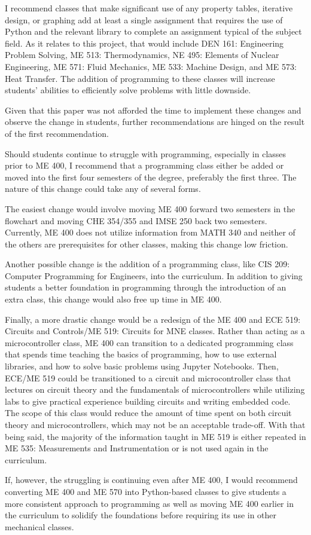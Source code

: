 I recommend classes that make significant use of any property tables, 
iterative design, or graphing add at least a single assignment that 
requires the use of Python and the relevant library to complete an assignment
typical of the subject field. As it relates to this project, that would include
DEN 161: Engineering Problem Solving, ME 513: Thermodynamics, NE 495: Elements 
of Nuclear Engineering, ME 571: Fluid Mechanics, ME 533: Machine Design, and 
ME 573: Heat Transfer. The addition of programming to these classes will 
increase students' abilities to efficiently solve problems with little downside. 

Given that this paper was not afforded the time to implement these changes
and observe the change in students, further recommendations are hinged on the
result of the first recommendation.

Should students continue to struggle with programming, especially in
classes prior to ME 400, I recommend that a programming class either be 
added or moved into the first four semesters of the degree, preferably 
the first three. The nature of this change could take any of several forms. 

The easiest change would involve moving ME 400 forward two semesters in the
flowchart and moving CHE 354/355 and IMSE 250 back two semesters. Currently,
ME 400 does not utilize information from MATH 340 and neither of the others
are prerequisites for other classes, making this change low friction. 

Another possible change is the addition of a programming class, like CIS 209: 
Computer Programming for Engineers, into the curriculum. In addition to 
giving students a better foundation in programming through the introduction
of an extra class, this change would also free up time in ME 400.

Finally, a more drastic change would be a redesign of the ME 400 and 
ECE 519: Circuits and Controls/ME 519: Circuits for MNE classes. Rather
than acting as a microcontroller class, ME 400 can transition to a dedicated
programming class that spends time teaching the basics of programming, how
to use external libraries, and how to solve basic problems using Jupyter
Notebooks. Then, ECE/ME 519 could be transitioned to a circuit and 
microcontroller class that lectures on circuit theory and the fundamentals
of microcontrollers while utilizing labs to give practical experience building
circuits and writing embedded code. The scope of this class would reduce
the amount of time spent on both circuit theory and microcontrollers, which
may not be an acceptable trade-off. With that being said, the majority
of the information taught in ME 519 is either repeated in ME 535:
Measurements and Instrumentation or is not used again in the curriculum.

If, however, the struggling is continuing even after ME 400, I would 
recommend converting ME 400 and ME 570 into Python-based classes to give
students a more consistent approach to programming as well as moving 
ME 400 earlier in the curriculum to solidify the foundations before 
requiring its use in other mechanical classes.
